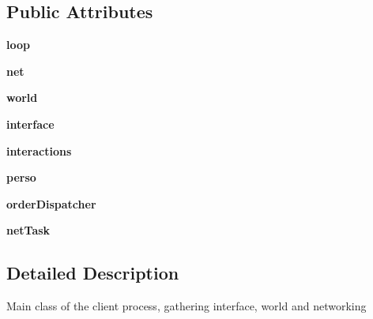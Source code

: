 \subsection*{\-Public \-Attributes}
\begin{DoxyCompactItemize}
\item 
\hypertarget{classsrc_1_1client_1_1_client_afa02eea991282bf02d100278cea7dbb2}{{\bfseries loop}}\label{classsrc_1_1client_1_1_client_afa02eea991282bf02d100278cea7dbb2}

\item 
\hypertarget{classsrc_1_1client_1_1_client_a22be7470a4f70a1cd0a5c159221e2080}{{\bfseries net}}\label{classsrc_1_1client_1_1_client_a22be7470a4f70a1cd0a5c159221e2080}

\item 
\hypertarget{classsrc_1_1client_1_1_client_a0c840b0412f44f9220d5c8e7e346527c}{{\bfseries world}}\label{classsrc_1_1client_1_1_client_a0c840b0412f44f9220d5c8e7e346527c}

\item 
\hypertarget{classsrc_1_1client_1_1_client_a78caa6f9fe676a4af8a46c916b1cb413}{{\bfseries interface}}\label{classsrc_1_1client_1_1_client_a78caa6f9fe676a4af8a46c916b1cb413}

\item 
\hypertarget{classsrc_1_1client_1_1_client_ad17d0fea293dd7c11c67a8783530f203}{{\bfseries interactions}}\label{classsrc_1_1client_1_1_client_ad17d0fea293dd7c11c67a8783530f203}

\item 
\hypertarget{classsrc_1_1client_1_1_client_a87fcde6757dca7443d16211dfcb0780f}{{\bfseries perso}}\label{classsrc_1_1client_1_1_client_a87fcde6757dca7443d16211dfcb0780f}

\item 
\hypertarget{classsrc_1_1client_1_1_client_a0c9576fe6e5e83ce95e13bbcbc50c6a2}{{\bfseries order\-Dispatcher}}\label{classsrc_1_1client_1_1_client_a0c9576fe6e5e83ce95e13bbcbc50c6a2}

\item 
\hypertarget{classsrc_1_1client_1_1_client_a5f57491efb00d472262135534c7f2ab5}{{\bfseries net\-Task}}\label{classsrc_1_1client_1_1_client_a5f57491efb00d472262135534c7f2ab5}

\end{DoxyCompactItemize}


\subsection{\-Detailed \-Description}
\begin{DoxyVerb}Main class of the client process, gathering interface, world and networking\end{DoxyVerb}
 

